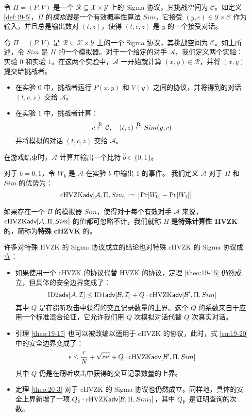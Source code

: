令 $\Pi=(P,V)$ 是一个 $\mathcal{R}\subseteq\mathcal{X}\times\mathcal{Y}$ 上的 Sigma 协议，其挑战空间为 $\mathcal C$。如定义 \ref{def:19-5}，$\Pi$ 的\emph{模拟器}是一个有效概率性算法 $Sim$，它接受 $(y,c)\in\mathcal{Y}\times\mathcal{C}$ 作为输入，并且总是输出数对 $(t,z)$，使得 $(t,c,z)$ 是 $y$ 的一个接受对话。

\begin{game}[特殊 cHVZK]\label{game:20-4}
令 $\Pi=(P,V)$ 是 $\mathcal{R}\subseteq\mathcal{X}\times\mathcal{Y}$ 上的一个 Sigma 协议，其挑战空间为 $\mathcal C$。如上所述，令 $Sim$ 是 $\Pi$ 的一个模拟器。对于一个给定的对手 $\mathcal A$，我们定义两个实验：实验 $0$ 和实验 $1$。在这两个实验中，$\mathcal A$ 一开始就计算 $(x,y)\in\mathcal{R}$，并将 $(x,y)$ 提交给挑战者。
\begin{itemize}
	\item 在实验 $0$ 中，挑战者运行 $P(x,y)$ 和 $V(y)$ 之间的协议，并将得到的对话 $(t,c,z)$ 交给 $\mathcal A$。
	\item 在实验 $1$ 中，挑战者计算：
	\[
    c\overset{\rm R}\leftarrow\mathcal C,
    \quad
    (t,z)\overset{\rm R}\leftarrow Sim(y,c)
    \]
    并将模拟的对话 $(t,c,z)$ 交给 $\mathcal A$。
\end{itemize}
在游戏结束时，$\mathcal A$ 计算并输出一个比特 $\hat b\in\{0,1\}$。

对于 $b=0,1$，令 $W_b$ 是 $\mathcal A$ 在实验 $b$ 中输出 $1$ 的事件。 我们定义 $\mathcal A$ 对于 $\Pi$ 和 $Sim$ 的优势为：
\[
{\rm cHVZK\mathsf{adv}}[\mathcal{A},\Pi,Sim]:=\big\lvert\Pr[W_0]-\Pr[W_1]\big\rvert
\]
\end{game}

\begin{definition}
如果存在一个 $\Pi$ 的模拟器 $Sim$，使得对于每个有效对手 $\mathcal A$ 来说，${\rm cHVZK\mathsf{adv}}[\mathcal{A},\Pi,Sim]$ 的值都可忽略不计，我们就称 $\Pi$ 是\textbf{特殊计算性 HVZK} 的，简称为\textbf{特殊 cHZVK} 的。
\end{definition}

许多对特殊 HVZK 的 Sigma 协议成立的结论也对特殊 cHVZK 的 Sigma 协议成立：
\begin{itemize}
	\item 如果使用一个 cHVZK 的协议代替 HVZK 的协议，定理 \ref{theo:19-15} 仍然成立，但具体的安全边界变成了：
	\[
    {\rm ID2\mathsf{adv}}[\mathcal A,\mathcal I]\leq{\rm ID1\mathsf{adv}}[\mathcal B,\mathcal I]+Q\cdot{\rm cHVZK\mathsf{adv}}[\mathcal{B}',\Pi,Sim]
    \]
    其中 $Q$ 是在窃听攻击中获得的交互记录数量的上界。这个 $Q$ 的系数来自于应用一个标准混合论证，它允许我们用 $Q$ 次模拟对话代替 $Q$ 次真实对话。
    \item 引理 \ref{theo:19-17} 也可以被改编以适用于 cHVZK 的协议，此时，式 \ref{eq:19-20} 中的安全边界变成了：
    \[
    \epsilon\leq\frac{r}{N}+\sqrt{r\epsilon'}+Q\cdot{\rm cHVZK\mathsf{adv}}[\mathcal{B}',\Pi,Sim]
    \]
    其中 $Q$ 仍是在窃听攻击中获得的交互记录数量的上界。
    \item 定理 \ref{theo:20-3} 对于 cHVZK 的 Sigma 协议也仍然成立。同样地，具体的安全上界新增了一项 $Q_{\rm p}\cdot{\rm cHVZK\mathsf{adv}}[\mathcal{B},\Pi,Sim_1]$，其中 $Q_{\rm p}$ 是证明查询的次数。
\end{itemize}

